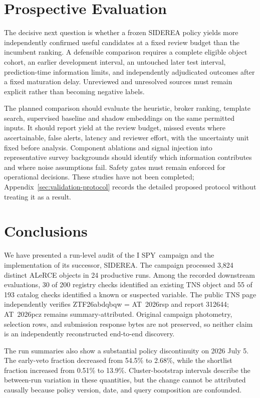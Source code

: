 \documentclass[11pt]{article}
\newcommand{\legacycampaign}{I SPY}
\newcommand{\siderea}{SIDEREA}
\begin{document}
\section{Prospective Evaluation}
\label{sec:validation}

The decisive next question is whether a frozen SIDEREA policy yields more independently confirmed useful candidates at a fixed review budget than the incumbent ranking. A defensible comparison requires a complete eligible object cohort, an earlier development interval, an untouched later test interval, prediction-time information limits, and independently adjudicated outcomes after a fixed maturation delay. Unreviewed and unresolved sources must remain explicit rather than becoming negative labels.

The planned comparison should evaluate the heuristic, broker ranking, template search, supervised baseline and shadow embeddings on the same permitted inputs. It should report yield at the review budget, missed events where ascertainable, false alerts, latency and reviewer effort, with the uncertainty unit fixed before analysis. Component ablations and signal injection into representative survey backgrounds should identify which information contributes and where noise assumptions fail. Safety gates must remain enforced for operational decisions. These studies have not been completed; Appendix~\ref{sec:validation-protocol} records the detailed proposed protocol without treating it as a result.

\section{Conclusions}

We have presented a run-level audit of the \legacycampaign\ campaign and the implementation of its successor, \siderea. The campaign processed 3,824 distinct ALeRCE objects in 24 productive runs. Among the recorded downstream evaluations, 30 of 200 registry checks identified an existing TNS object and 55 of 193 catalog checks identified a known or suspected variable. The public TNS page independently verifies ZTF26abdqbqw = AT~2026rsp and report 312644; AT~2026pcz remains summary-attributed. Original campaign photometry, selection rows, and submission response bytes are not preserved, so neither claim is an independently reconstructed end-to-end discovery.

The run summaries also show a substantial policy discontinuity on 2026 July 5. The early-veto fraction decreased from 54.5\% to 2.68\%, while the shortlist fraction increased from 0.51\% to 13.9\%. Cluster-bootstrap intervals describe the between-run variation in these quantities, but the change cannot be attributed causally because policy version, date, and query composition are confounded.
\end{document}
